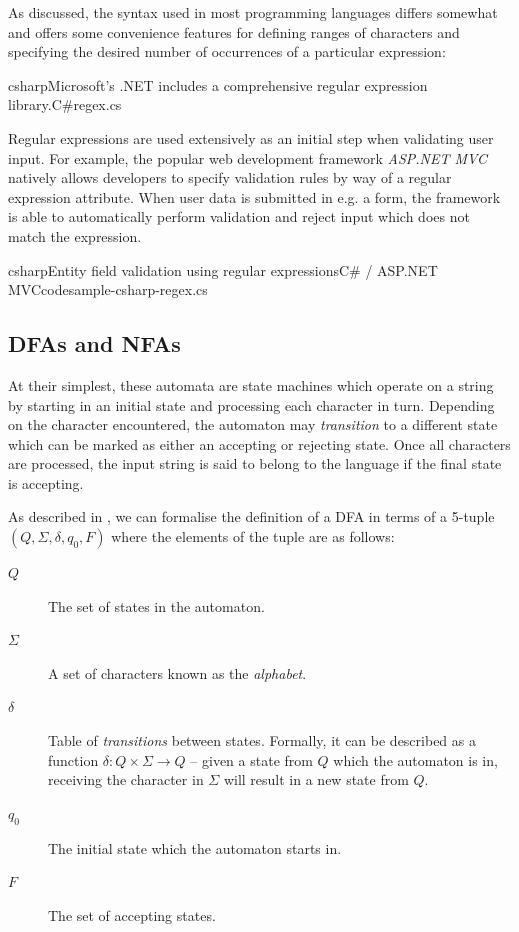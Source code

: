 \documentclass[a4paper,openany,12pt]{book}
\begin{document}
As discussed, the syntax used in most programming languages differs somewhat and offers some convenience features for
defining ranges of characters and specifying the desired number of occurrences of a particular expression:\\

\begin{mycodefile}{csharp}{Microsoft's .NET includes a comprehensive regular expression library.}{C\#}{regex.cs}
\end{mycodefile}

Regular expressions are used extensively as an initial step when validating user input.
For example, the popular web development framework \emph{ASP.NET MVC} natively allows developers to specify validation
rules by way of a regular expression attribute.
When user data is submitted in e.g. a form, the framework is able to automatically perform validation and reject input
which does not match the expression.

\begin{mycodefile}{csharp}{Entity field validation using regular expressions}{C\# / ASP.NET MVC}{codesample-csharp-regex.cs}
\end{mycodefile}

\subsection{DFAs and NFAs}
At their simplest, these automata are state machines which operate on a string by starting in an initial state and
processing each character in turn.
Depending on the character encountered, the automaton may \emph{transition} to a different state which can be marked as
either an accepting or rejecting state.
Once all characters are processed, the input string is said to belong to the language if the final state is accepting.

As described in \citet[p.~35]{sipser2012introduction}, we can formalise the definition of a DFA in terms of a 5-tuple
$(Q, \Sigma, \delta, q_0, F)$ where the elements of the tuple are as follows:

\begin{description}
    \item[$Q$] The set of states in the automaton.
    \item[$\Sigma$] A set of characters known as the \emph{alphabet}.
    \item[$\delta$] Table of \emph{transitions} between states.
                    Formally, it can be described as a function $\delta : Q \times \Sigma \rightarrow Q$ -- given a
                    state from $Q$ which the automaton is in, receiving the character in $\Sigma$ will result in a
                    new state from $Q$.
    \item[$q_0$] The initial state which the automaton starts in.
    \item[$F$] The set of accepting states.
\end{description}
    
\end{document}
